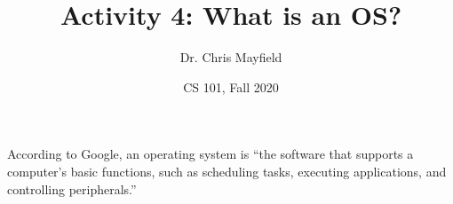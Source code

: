 \documentclass[12pt]{article}
\title{Activity 4: What is an OS?}
\author{Dr. Chris Mayfield}
\date{CS 101, Fall 2020}
\begin{document}
\maketitle

According to Google, an operating system is ``the software that supports a computer's basic functions, such as scheduling tasks, executing applications, and controlling peripherals.''



\end{document}
